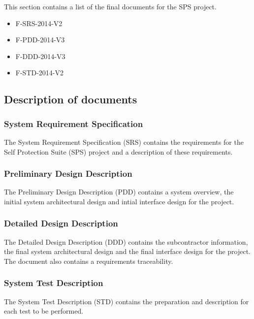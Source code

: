 This section contains a list of the final documents for the SPS project.\\
\begin{itemize}
\item F-SRS-2014-V2
\item F-PDD-2014-V3
\item F-DDD-2014-V3
\item F-STD-2014-V2\\
\end{itemize}

\subsection{Description of documents}
\subsubsection{System Requirement Specification}
The System Requirement Specification (SRS) contains the requirements for the Self Protection Suite (SPS) project and a description of these requirements.\\
\subsubsection{Preliminary Design Description}
The Preliminary Design Description (PDD) contains a system overview, the initial system architectural design and intial interface design for the project.\\
\subsubsection{Detailed Design Description}
The Detailed Design Description (DDD) contains the subcontractor information, the final system architectural design and the final interface design for the project. The document also contains a requirements traceability.\\
\subsubsection{System Test Description}
The System Test Description (STD) contains  the preparation and description for each test to be performed.\\



